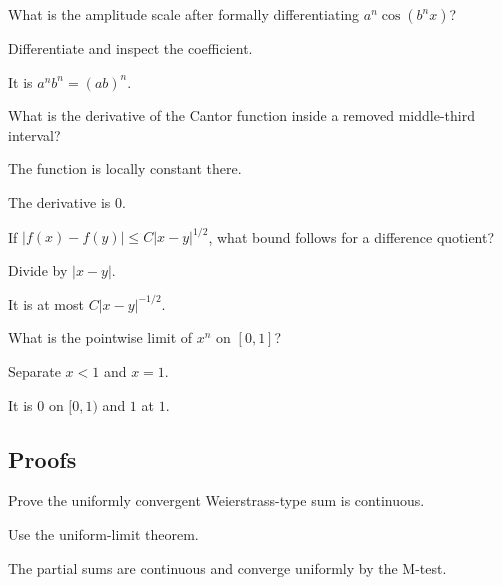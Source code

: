 \begin{exercise}\label{exr:ii15-expand-02}
What is the amplitude scale after formally differentiating \(a^n\cos(b^nx)\)?
\end{exercise}
\begin{hint}
Differentiate and inspect the coefficient.
\end{hint}
\begin{solution}
It is \(a^n b^n=(ab)^n\).
\end{solution}

\begin{exercise}\label{exr:ii15-expand-03}
What is the derivative of the Cantor function inside a removed middle-third interval?
\end{exercise}
\begin{hint}
The function is locally constant there.
\end{hint}
\begin{solution}
The derivative is \(0\).
\end{solution}

\begin{exercise}\label{exr:ii15-expand-04}
If \(|f(x)-f(y)|\le C|x-y|^{1/2}\), what bound follows for a difference quotient?
\end{exercise}
\begin{hint}
Divide by \(|x-y|\).
\end{hint}
\begin{solution}
It is at most \(C|x-y|^{-1/2}\).
\end{solution}

\begin{exercise}\label{exr:ii15-expand-05}
What is the pointwise limit of \(x^n\) on \([0,1]\)?
\end{exercise}
\begin{hint}
Separate \(x<1\) and \(x=1\).
\end{hint}
\begin{solution}
It is \(0\) on \([0,1)\) and \(1\) at \(1\).
\end{solution}

\subsection*{Proofs}

\begin{exercise}\label{exr:ii15-expand-06}
Prove the uniformly convergent Weierstrass-type sum is continuous.
\end{exercise}
\begin{hint}
Use the uniform-limit theorem.
\end{hint}
\begin{solution}
The partial sums are continuous and converge uniformly by the M-test.
\end{solution}


